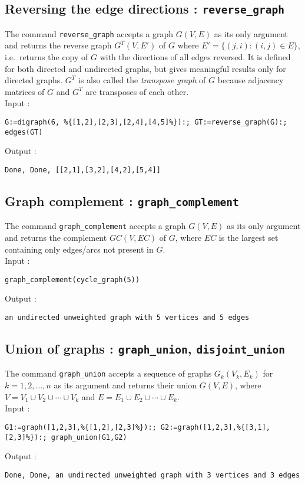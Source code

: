 \documentclass[a4paper,11pt]{article}
\begin{document}
\subsection{Reversing the edge directions : {\tt reverse\_graph}}

The command {\tt reverse\_graph} accepts a graph $ G(V,E) $ as its only argument and returns the reverse graph $ G^T(V,E') $ of $ G $ where $ E'=\{(j,i):(i,j)\in E\} $, i.e.~returns the copy of $ G $ with the directions of all edges reversed. It is defined for both directed and undirected graphs, but gives meaningful results only for directed graphs. $ G^T $ is also called the \emph{transpose graph} of $ G $ because adjacency matrices of $ G $ and $ G^T $ are transposes of each other.\\
Input :
\begin{center}
  \tt G:=digraph(6, \%\{[1,2],[2,3],[2,4],[4,5]\%\}):; GT:=reverse\_graph(G):; edges(GT)
\end{center}
Output :
\begin{center}
  \tt Done, Done, [[2,1],[3,2],[4,2],[5,4]]
\end{center}

\subsection{Graph complement : {\tt graph\_complement}}

The command {\tt graph\_complement} accepts a graph $ G(V,E) $ as its only argument and returns the complement $ GC(V,EC) $ of $ G $, where $ EC $ is the largest set containing only edges/arcs not present in $ G $.\\
Input :
\begin{center}
  \tt graph\_complement(cycle\_graph(5))
\end{center}
Output :
\begin{center}
  \tt an undirected unweighted graph with 5 vertices and 5 edges
\end{center}

\subsection{Union of graphs : {\tt graph\_union}, {\tt disjoint\_union}}

The command {\tt graph\_union} accepts a sequence of graphs $ G_k(V_k,E_k) $ for $ k=1,2,\dots,n $ as its argument and returns their union $ G(V,E) $, where $ V=V_1\cup V_2\cup\cdots\cup V_k $ and $ E=E_1\cup E_2\cup\cdots\cup E_k $.\\
Input :
\begin{center}
  \tt G1:=graph([1,2,3],\%\{[1,2],[2,3]\%\}):; G2:=graph([1,2,3],\%\{[3,1],[2,3]\%\}):; graph\_union(G1,G2)
\end{center}
Output :
\begin{center}
  \tt Done, Done, an undirected unweighted graph with 3 vertices and 3 edges
\end{center}
\end{document}
